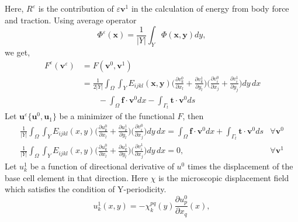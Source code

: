 \documentclass[10pt]{article}
\newcommand{\e}[1]{\textbf{#1}}
\begin{document}
Here, $R^\varepsilon$ is the contribution of $\varepsilon\textbf{v}^1$ in the calculation of energy from body force and traction.
Using average operator 
\begin{equation}
\Phi^\varepsilon(\e x) = \frac{1}{|Y|}\int_Y \Phi(\e x,\e y)dy,
\end{equation}
we get,
\begin{equation}
\begin{split}
\,F^\varepsilon(\textbf{v}^\varepsilon)&=F(\textbf{v}^0,\textbf{v}^1)\\
&=\frac{1}{2|Y|}\int_\Omega\int_Y E_{ijkl}(\e x,\e y) \bigg (\frac{\partial v_{k}^0}{\partial x_l}+\frac{\partial v_{k}^1}{\partial y_l}\bigg )\bigg (\frac{\partial v_{i}^0}{\partial x_j}+\frac{\partial v_{i}^1}{\partial y_j}\bigg )dy\,dx\\
&\qquad-\int_\Omega\textbf{f}\cdot\textbf{v}^0 dx - \int_{\Gamma_t}\textbf{t}\cdot\textbf{v}^0 ds 
\end{split}
\end{equation}
Let $\e u^\varepsilon\{\textbf{u}^0, \textbf{u}_1\}$ be a minimizer of the functional $F$, then 
\begin{eqnarray}
\label{eq:functional1}
\frac{1}{|Y|}\int_\Omega\int_Y E_{ijkl}(x,y)\bigg (\frac{\partial u_{k}^0}{\partial x_l}+\frac{\partial u_{k}^1}{\partial y_l}\bigg )\bigg (\frac{\partial v_{i}^0}{\partial x_j}\bigg ) dy\,dx = \int_\Omega\textbf{f}\cdot\textbf{v}^0 dx + \int_{\Gamma_t}\textbf{t}\cdot\textbf{v}^0 ds &\forall \textbf{v}^0\\
\label{eq:functional2}
\frac{1}{|Y|}\int_\Omega\int_Y E_{ijkl}(x,y)\bigg (\frac{\partial u_{k}^0}{\partial x_l}+\frac{\partial u_{k}^1}{\partial y_l}\bigg )\bigg (\frac{\partial v_{i}^1}{\partial x_j}\bigg ) dy\,dx = 0,  &\forall \textbf{v}^1
\end{eqnarray}
Let $u_{k}^1$ be a function of directional derivative of $u^0$ times the displacement of the base cell element in that direction. Here $\chi$ is the microscopic displacement field which satisfies the condition of Y-periodicity.
\begin{equation}\label{localization}
u_{k}^1(x,y)=-\chi^{pq}_k(y)\frac{\partial u_{p}^0}{\partial x_q}(x),
\end{equation}
\end{document}
